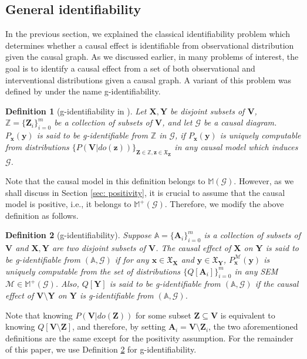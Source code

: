 \documentclass[accepted]{uai2022}
\newtheorem{definition}{Definition}
\newcommand{\V}[0]{\mathbf{V}}
\newcommand{\X}[0]{\mathbf{X}}
\newcommand{\Y}[0]{\mathbf{Y}}
\newcommand{\Z}[0]{\mathbf{Z}}
\newcommand{\A}[0]{\mathbf{A}}
\newcommand{\x}[0]{\mathbf{x}}
\newcommand{\y}[0]{\mathbf{y}}
\newcommand{\z}[0]{\mathbf{z}}
\newcommand{\G}[0]{\mathcal{G}}
\newcommand{\M}[0]{\mathcal{M}}
\newcommand{\dom}[1]{\mathfrak{X}_{#1}}
\begin{document}
    \subsection{General identifiability}
        In the previous section, we explained the classical identifiability problem which determines whether a causal effect is identifiable from observational distribution given the causal graph. 
        As we discussed earlier, in many problems of interest, the goal is to identify a causal effect from a set of both observational and interventional distributions given a causal graph. 
        A variant of this problem was defined by \cite{lee2019general} under the name g-identifiability.
        
        \begin{definition}[g-identifiability in  \citep{lee2019general}]\label{def: gid_old}
            Let $\X, \Y$ be disjoint subsets of $\V$, $\mathbb{Z}=\{\Z_i\}_{i=0}^{m}$ be a collection of subsets of $\V$, and let $\G$ be a causal diagram. 
            $P_{\x}(\y)$ is said to be g-identifiable from $\mathbb{Z}$ in $\G$, if $P_{\mathbf{x}}(\mathbf{y})$ is uniquely computable from distributions $\{P(\V|do(\z))\}_{\Z\in \mathbb{Z}, \z\in \dom{\Z}}$ in any causal model which induces $\G$.
        \end{definition}
        
        Note that the causal model in this definition belongs to $\mathbb{M}(\G)$.
        However, as we shall discuss in Section \ref{sec: positivity}, it is crucial to assume that the causal model is positive, i.e., it belongs to $\mathbb{M}^+(\G)$.
        Therefore, we modify the above definition as follows.
    
        \begin{definition}[g-identifiability] \label{def: gid}
            Suppose $\mathbb{A}=\{\A_i\}_{i=0}^m$ is a collection of subsets of $\V$ and $\X, \Y$ are two disjoint subsets of $\V$.
            The causal effect of $\X$ on $\Y$ is said to be g-identifiable from $(\mathbb{A}, \G)$ if for any $\x \in \dom{\X}$ and $\y \in \dom{\Y}$, $P^{\M}_{\x}(\y)$ is uniquely computable from the set of distributions $\{Q[\A_i]\}_{i=0}^m$ in any SEM $\M \in \mathbb{M}^{+}(\G)$.
            Also, $Q[\Y]$ is said to be g-identifiable from $(\mathbb{A}, \G)$ if the causal effect of $\V \setminus \Y$ on $\Y$ is g-identifiable from $(\mathbb{A}, \G)$.
        \end{definition}
        
        Note that knowing $P(\V|do(\Z))$ for some subset $\Z\subseteq\V$ is equivalent to knowing $Q[\V \setminus \Z]$, and therefore, by setting $\A_i = \V \setminus \Z_i$, the two aforementioned definitions are the same except for the positivity assumption.
        For the remainder of this paper, we use Definition \ref{def: gid} for g-identifiability.
    
\end{document}
